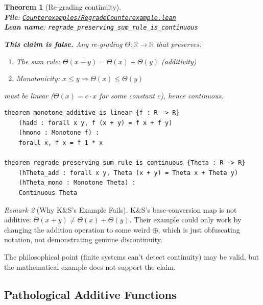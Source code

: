 \documentclass[11pt]{article}
\newtheorem{theorem}{Theorem}[section]
\theoremstyle{definition}
\theoremstyle{remark}
\newtheorem{remark}[theorem]{Remark}
\begin{document}
\begin{theorem}[Re-grading continuity]
\leavevmode\\
\textbf{File}: \href{https://github.com/zariuq/ks-foundations-of-inference/blob/main/KnuthSkilling/Counterexamples/RegradeCounterexample.lean}{\texttt{Counterexamples/RegradeCounterexample.lean}}\\
\textbf{Lean name}: \texttt{regrade\_preserving\_sum\_rule\_is\_continuous}

\textbf{This claim is false.} Any re-grading $\Theta: \mathbb{R} \to \mathbb{R}$ that preserves:
\begin{enumerate}
\item The sum rule: $\Theta(x + y) = \Theta(x) + \Theta(y)$ (additivity)
\item Monotonicity: $x \leq y \Rightarrow \Theta(x) \leq \Theta(y)$
\end{enumerate}
must be linear ($\Theta(x) = c \cdot x$ for some constant $c$), hence continuous.
\end{theorem}

\begin{lstlisting}[caption={Monotone additive functions are linear (\href{https://github.com/zariuq/ks-foundations-of-inference/blob/main/KnuthSkilling/Counterexamples/RegradeCounterexample.lean\#L100}{RegradeCounterexample.lean:100})},numbers=none]
theorem monotone_additive_is_linear {f : R -> R}
    (hadd : forall x y, f (x + y) = f x + f y)
    (hmono : Monotone f) :
    forall x, f x = f 1 * x

theorem regrade_preserving_sum_rule_is_continuous {Theta : R -> R}
    (hTheta_add : forall x y, Theta (x + y) = Theta x + Theta y)
    (hTheta_mono : Monotone Theta) :
    Continuous Theta
\end{lstlisting}

\begin{remark}[Why K\&S's Example Fails]
K\&S's base-conversion map is not additive: $\Theta(x + y) \neq \Theta(x) + \Theta(y)$.
Their example could only work by changing the addition operation to some weird $\oplus$,
which is just obfuscating notation, not demonstrating genuine discontinuity.

The philosophical point (finite systems can't detect continuity) may be valid,
but the mathematical example does not support the claim.
\end{remark}

\subsection{Pathological Additive Functions}
\end{document}
